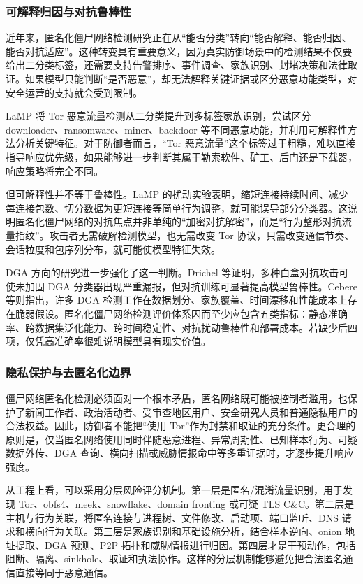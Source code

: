 \subsubsection{可解释归因与对抗鲁棒性}
\label{subsec:robustness}

近年来，匿名化僵尸网络检测研究正在从“能否分类”转向“能否解释、能否归因、能否对抗适应”。这种转变具有重要意义，因为真实防御场景中的检测结果不仅要给出二分类标签，还需要支持告警排序、事件调查、家族识别、封堵决策和法律取证。如果模型只能判断“是否恶意”，却无法解释关键证据或区分恶意功能类型，对安全运营的支持就会受到限制。

LaMP 将 Tor 恶意流量检测从二分类提升到多标签家族识别，尝试区分 downloader、ransomware、miner、backdoor 等不同恶意功能，并利用可解释性方法分析关键特征\cite{karunanayake2024examining}。对于防御者而言，“Tor 恶意流量”这个标签过于粗糙，难以直接指导响应优先级，如果能够进一步判断其属于勒索软件、矿工、后门还是下载器，响应策略将完全不同。

但可解释性并不等于鲁棒性。LaMP 的扰动实验表明，缩短连接持续时间、减少每连接包数、切分数据为更短连接等简单行为调整，就可能误导部分分类器\cite{karunanayake2024examining}。这说明匿名化僵尸网络的对抗焦点并非单纯的“加密对抗解密”，而是“行为整形对抗流量指纹”。攻击者无需破解检测模型，也无需改变 Tor 协议，只需改变通信节奏、会话粒度和包序列分布，就可能使模型特征失效。

DGA 方向的研究进一步强化了这一判断。Drichel 等证明，多种白盒对抗攻击可使未加固 DGA 分类器出现严重漏报，但对抗训练可显著提高模型鲁棒性\cite{drichel2024robust}。Cebere 等则指出，许多 DGA 检测工作在数据划分、家族覆盖、时间漂移和性能成本上存在脆弱假设\cite{cebere2024down}。匿名化僵尸网络检测评价体系因而至少应包含五类指标：静态准确率、跨数据集泛化能力、跨时间稳定性、对抗扰动鲁棒性和部署成本。若缺少后四项，仅凭高准确率很难说明模型具有现实价值。

\subsubsection{隐私保护与去匿名化边界}
\label{subsec:privacy_governance}

僵尸网络匿名化检测必须面对一个根本矛盾，匿名网络既可能被控制者滥用，也保护了新闻工作者、政治活动者、受审查地区用户、安全研究人员和普通隐私用户的合法权益。因此，防御者不能把“使用 Tor”作为封禁和取证的充分条件。更合理的原则是，仅当匿名网络使用同时伴随恶意进程、异常周期性、已知样本行为、可疑数据外传、DGA 查询、横向扫描或威胁情报命中等多重证据时，才逐步提升响应强度。

从工程上看，可以采用分层风险评分机制。第一层是匿名/混淆流量识别，用于发现 Tor、obfs4、meek、snowflake、domain fronting 或可疑 TLS C\&C。第二层是主机与行为关联，将匿名连接与进程树、文件修改、启动项、端口监听、DNS 请求和横向行为关联。第三层是家族识别和基础设施分析，结合样本逆向、onion 地址提取、DGA 预测、P2P 拓扑和威胁情报进行归因。第四层才是干预动作，包括阻断、隔离、sinkhole、取证和执法协作。这样的分层机制能够避免把合法匿名通信直接等同于恶意通信。

